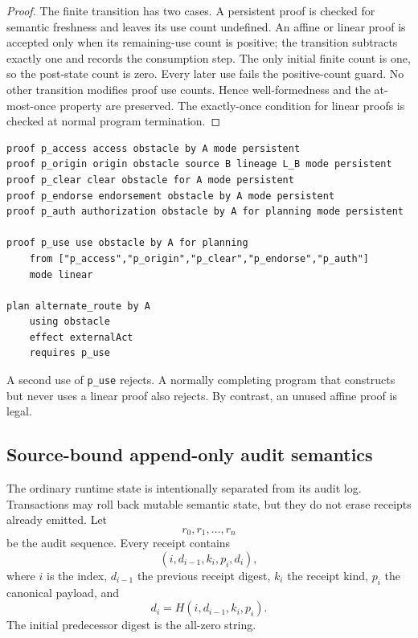 \begin{proof}
The finite transition has two cases.  A persistent proof is checked for semantic freshness and leaves its use count undefined.  An affine or linear proof is accepted only when its remaining-use count is positive; the transition subtracts exactly one and records the consumption step.  The only initial finite count is one, so the post-state count is zero.  Every later use fails the positive-count guard.  No other transition modifies proof use counts.  Hence well-formedness and the at-most-once property are preserved.  The exactly-once condition for linear proofs is checked at normal program termination.  \qedhere
\end{proof}

\begin{lstlisting}[style=osl,caption={A linear planning proof that is consumed exactly once.}]
proof p_access access obstacle by A mode persistent
proof p_origin origin obstacle source B lineage L_B mode persistent
proof p_clear clear obstacle for A mode persistent
proof p_endorse endorsement obstacle by A mode persistent
proof p_auth authorization obstacle by A for planning mode persistent

proof p_use use obstacle by A for planning
    from ["p_access","p_origin","p_clear","p_endorse","p_auth"]
    mode linear

plan alternate_route by A
    using obstacle
    effect externalAct
    requires p_use
\end{lstlisting}

A second use of \texttt{p\_use} rejects.  A normally completing program that constructs but never uses a linear proof also rejects.  By contrast, an unused affine proof is legal.

\subsection{Source-bound append-only audit semantics}

The ordinary runtime state is intentionally separated from its audit log.  Transactions may roll back mutable semantic state, but they do not erase receipts already emitted.  Let
\[
r_0,r_1,\ldots,r_n
\]
be the audit sequence.  Every receipt contains
\[
(i,d_{i-1},k_i,p_i,d_i),
\]
where \(i\) is the index, \(d_{i-1}\) the previous receipt digest, \(k_i\) the receipt kind, \(p_i\) the canonical payload, and
\[
d_i=H(i,d_{i-1},k_i,p_i).
\]
The initial predecessor digest is the all-zero string.

